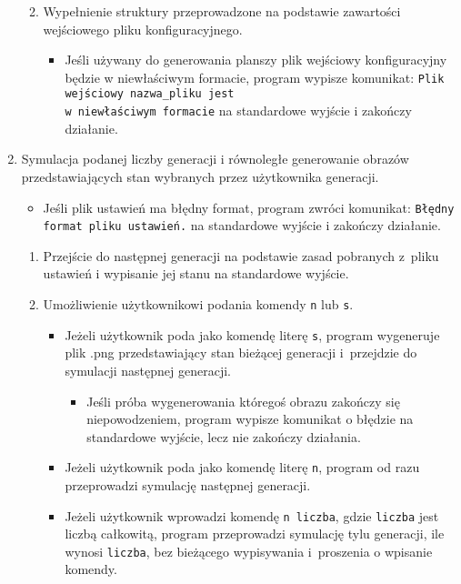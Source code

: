 \documentclass[a4paper,11pt, notitlepage ]{article}
\begin{document}
\begin{enumerate}
\begin{enumerate}[label*=\arabic*.]
\begin{itemize}
\end{itemize}
\item Wypełnienie struktury przeprowadzone na podstawie zawartości wejściowego pliku konfiguracyjnego.
\begin{itemize}
\item Jeśli używany do generowania planszy plik wejściowy konfiguracyjny będzie w niewłaściwym formacie, program wypisze komunikat: \verb+Plik wejściowy nazwa_pliku jest+ \\\verb+w niewłaściwym formacie+ na standardowe wyjście i zakończy działanie.
\end{itemize}
\end{enumerate}
\item Symulacja podanej liczby generacji i równoległe generowanie obrazów przedstawiających stan wybranych przez użytkownika generacji.
\begin{itemize}
\item Jeśli plik ustawień ma błędny format, program zwróci komunikat: \verb+Błędny format pliku ustawień.+ na standardowe wyjście i zakończy działanie.
\end{itemize}
\begin{enumerate}[label*=\arabic*.]
\item Przejście do następnej generacji na podstawie zasad pobranych z~pliku ustawień i wypisanie jej stanu na standardowe wyjście.
\item Umożliwienie użytkownikowi podania komendy \verb+n+ lub \verb+s+.
\begin{itemize}
\item Jeżeli użytkownik poda jako komendę literę \verb+s+, program wygeneruje plik .png przedstawiający stan bieżącej generacji i~przejdzie do symulacji następnej generacji.
\begin{itemize}
\item Jeśli próba wygenerowania któregoś obrazu zakończy się niepowodzeniem, program wypisze komunikat o błędzie na standardowe wyjście, lecz nie zakończy działania.
\end{itemize}
\item Jeżeli użytkownik poda jako komendę literę \verb+n+, program od razu przeprowadzi symulację następnej generacji.
\item Jeżeli użytkownik wprowadzi komendę \verb+n liczba+, gdzie \verb+liczba+ jest liczbą całkowitą, program przeprowadzi symulację tylu generacji, ile wynosi \verb+liczba+, bez bieżącego wypisywania i~proszenia o wpisanie komendy.
\begin{itemize}

\end{itemize}
\end{itemize}
\end{enumerate}
\end{enumerate}
\end{document}
